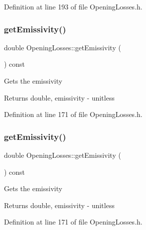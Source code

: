 Definition at line 193 of file Opening\+Losses.\+h.

\mbox{\label{class_opening_losses_a7eaf8e68f268e8ff1671c5f9f0462b4f}} 
\subsubsection{\texorpdfstring{get\+Emissivity()}{getEmissivity()}\hspace{0.1cm}{\footnotesize\ttfamily [1/3]}}
{\footnotesize\ttfamily double Opening\+Losses\+::get\+Emissivity (\begin{DoxyParamCaption}{ }\end{DoxyParamCaption}) const\hspace{0.3cm}{\ttfamily [inline]}}

Gets the emissivity

\begin{DoxyReturn}{Returns}
double, emissivity -\/ unitless 
\end{DoxyReturn}


Definition at line 171 of file Opening\+Losses.\+h.

\mbox{\label{class_opening_losses_a7eaf8e68f268e8ff1671c5f9f0462b4f}} 
\subsubsection{\texorpdfstring{get\+Emissivity()}{getEmissivity()}\hspace{0.1cm}{\footnotesize\ttfamily [2/3]}}
{\footnotesize\ttfamily double Opening\+Losses\+::get\+Emissivity (\begin{DoxyParamCaption}{ }\end{DoxyParamCaption}) const\hspace{0.3cm}{\ttfamily [inline]}}

Gets the emissivity

\begin{DoxyReturn}{Returns}
double, emissivity -\/ unitless 
\end{DoxyReturn}


Definition at line 171 of file Opening\+Losses.\+h.

